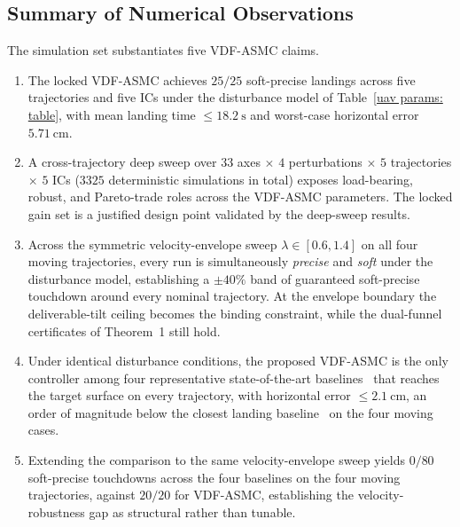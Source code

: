 \documentclass{IEEEtaes}
\begin{document}
\subsection{Summary of Numerical Observations}
\label{summary: subsec}
The simulation set substantiates five VDF-ASMC claims.
\begin{enumerate}
    \item The locked VDF-ASMC achieves $25/25$ soft-precise landings across five trajectories and five ICs under the disturbance model of Table~\ref{uav params: table}, with mean landing time $\le 18.2~\text{s}$ and worst-case horizontal error $5.71~\text{cm}$.
    \item A cross-trajectory deep sweep over $33$ axes $\times$ $4$ perturbations $\times$ $5$ trajectories $\times$ $5$ ICs ($3325$ deterministic simulations in total) exposes load-bearing, robust, and Pareto-trade roles across the VDF-ASMC parameters. The locked gain set is a justified design point validated by the deep-sweep results.
    \item Across the symmetric velocity-envelope sweep $\lambda\in[0.6,1.4]$ on all four moving trajectories, every run is simultaneously \emph{precise} and \emph{soft} under the disturbance model, establishing a $\pm 40\%$ band of guaranteed soft-precise touchdown around every nominal trajectory. At the envelope boundary the deliverable-tilt ceiling becomes the binding constraint, while the dual-funnel certificates of Theorem~1 still hold.
    \item Under identical disturbance conditions, the proposed VDF-ASMC is the only controller among four representative state-of-the-art baselines~\cite{lin2022,zhang2026,lin2023,cho2022} that reaches the target surface on every trajectory, with horizontal error $\le 2.1~\text{cm}$, an order of magnitude below the closest landing baseline~\cite{zhang2026} on the four moving cases.
    \item Extending the comparison to the same velocity-envelope sweep yields $0/80$ soft-precise touchdowns across the four baselines on the four moving trajectories, against $20/20$ for VDF-ASMC, establishing the velocity-robustness gap as structural rather than tunable.
\end{enumerate}



\end{document}
